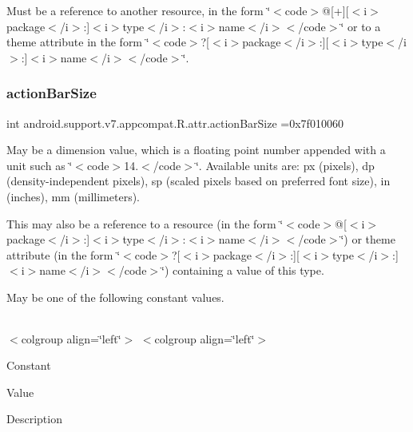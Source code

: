 Must be a reference to another resource, in the form \char`\"{}$<$code$>$@\mbox{[}+\mbox{]}\mbox{[}$<$i$>$package$<$/i$>$\+:\mbox{]}$<$i$>$type$<$/i$>$\+:$<$i$>$name$<$/i$>$$<$/code$>$\char`\"{} or to a theme attribute in the form \char`\"{}$<$code$>$?\mbox{[}$<$i$>$package$<$/i$>$\+:\mbox{]}\mbox{[}$<$i$>$type$<$/i$>$\+:\mbox{]}$<$i$>$name$<$/i$>$$<$/code$>$\char`\"{}. \mbox{\label{classandroid_1_1support_1_1v7_1_1appcompat_1_1R_1_1attr_ada080c72115e2640eef32a1cb3f07176}} 
\subsubsection{\texorpdfstring{action\+Bar\+Size}{actionBarSize}}
{\footnotesize\ttfamily int android.\+support.\+v7.\+appcompat.\+R.\+attr.\+action\+Bar\+Size =0x7f010060\hspace{0.3cm}{\ttfamily [static]}}

May be a dimension value, which is a floating point number appended with a unit such as \char`\"{}$<$code$>$14.\+5sp$<$/code$>$\char`\"{}. Available units are\+: px (pixels), dp (density-\/independent pixels), sp (scaled pixels based on preferred font size), in (inches), mm (millimeters). 

This may also be a reference to a resource (in the form \char`\"{}$<$code$>$@\mbox{[}$<$i$>$package$<$/i$>$\+:\mbox{]}$<$i$>$type$<$/i$>$\+:$<$i$>$name$<$/i$>$$<$/code$>$\char`\"{}) or theme attribute (in the form \char`\"{}$<$code$>$?\mbox{[}$<$i$>$package$<$/i$>$\+:\mbox{]}\mbox{[}$<$i$>$type$<$/i$>$\+:\mbox{]}$<$i$>$name$<$/i$>$$<$/code$>$\char`\"{}) containing a value of this type. 

May be one of the following constant values.

\tabulinesep=1mm
\begin{longtabu} spread 0pt [c]{*{0}{|X[-1]}|}
\hline
\end{longtabu}
$<$colgroup align=\char`\"{}left\char`\"{}$>$ $<$colgroup align=\char`\"{}left\char`\"{}$>$ 

Constant

Value

Description 

